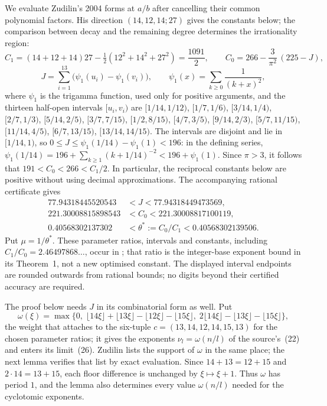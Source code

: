 \documentclass[11pt]{article}
\begin{document}
We evaluate Zudilin's 2004 forms at $a/b$ after cancelling their
common polynomial factors. His direction $(14,12,14;27)$
\cite[Sec.~5, pp.~161--162]{zudilin2004} gives the constants below;
the comparison between decay and the remaining degree determines
the irrationality region:
\[
 C_1=(14+12+14)27-\tfrac12(12^2+14^2+27^2)=\frac{1091}{2},
 \qquad
 C_0=266-\frac{3}{\pi^{2}}\,(225-J),
\]
\[
 J=\sum_{i=1}^{13}\bigl(\psi_1(u_i)-\psi_1(v_i)\bigr),
 \qquad
 \psi_1(x)=\sum_{k\ge0}\frac1{(k+x)^{2}},
\]
where $\psi_1$ is the trigamma function, used only for positive arguments,
and the thirteen half-open intervals $[u_i,v_i)$ are
$[1/14,1/12)$, $[1/7,1/6)$, $[3/14,1/4)$, $[2/7,1/3)$, $[5/14,2/5)$,
$[3/7,7/15)$, $[1/2,8/15)$, $[4/7,3/5)$, $[9/14,2/3)$, $[5/7,11/15)$,
$[11/14,4/5)$, $[6/7,13/15)$, $[13/14,14/15)$.
The intervals are disjoint and lie in $[1/14,1)$, so
$0\le J\le\psi_1(1/14)-\psi_1(1)<196$: in the defining series,
$\psi_1(1/14)=196+\sum_{k\ge1}(k+1/14)^{-2}<196+\psi_1(1)$.
Since $\pi>3$, it follows that $191<C_0<266<C_1/2$.
In particular, the reciprocal constants below are positive without
using decimal approximations. The accompanying rational certificate gives
\[
\begin{aligned}
77.94318445520543&<J<77.94318449473569,\\
221.30008815898543&<C_0<221.30008817100119,\\
0.40568302137302&<\theta^*:=C_0/C_1<0.40568302139506.
\end{aligned}
\]
Put $\mu=1/\theta^*$. These parameter ratios, intervals and constants, including
$C_1/C_0=2.46497868\ldots$, occur in \cite[p.~162]{zudilin2004}; that ratio
is the integer-base exponent bound in its Theorem~1, not a new optimised
constant. The displayed interval endpoints are rounded outwards from
rational bounds; no digits beyond their certified accuracy are required.

The proof below needs $J$ in its combinatorial form as well.  Put
\[
 \omega(\xi)=\max\bigl\{0,\;
 \lfloor14\xi\rfloor+\lfloor13\xi\rfloor-\lfloor12\xi\rfloor-\lfloor15\xi\rfloor,\;
 2\lfloor14\xi\rfloor-\lfloor13\xi\rfloor-\lfloor15\xi\rfloor\bigr\},
\]
the weight that \cite[p.~162]{zudilin2004} attaches to the six-tuple
$c=(13,14,12,14,15,13)$ for the chosen parameter ratios; it gives the exponents
$\nu_l=\omega(n/l)$ of the source's~(22) and enters its limit~(26).  Zudilin
lists the support of $\omega$ in the same place; the next lemma verifies that
list by exact evaluation. Since $14+13=12+15$ and $2\cdot14=13+15$,
each floor difference is unchanged by $\xi\mapsto\xi+1$. Thus $\omega$
has period $1$, and the lemma also determines every value $\omega(n/l)$
needed for the cyclotomic exponents.
\end{document}
